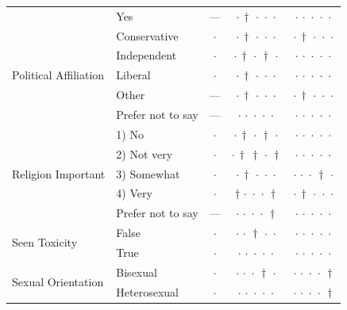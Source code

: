 {\begin{longtable}[t]{llccc}
 & Yes & --- & ${\cdot}\,{\dagger}\,{\cdot}\,{\cdot}\,{\cdot}$ & ${\cdot}\,{\cdot}\,{\cdot}\,{\cdot}\,{\cdot}$ \\
\cline{1-5}
\multirow[t]{5}{*}{Political Affiliation} & Conservative & $\cdot$ & ${\cdot}\,{\dagger}\,{\cdot}\,{\cdot}\,{\cdot}$ & ${\cdot}\,{\dagger}\,{\cdot}\,{\cdot}\,{\cdot}$ \\
 & Independent & $\cdot$ & ${\cdot}\,{\dagger}\,{\cdot}\,{\dagger}\,{\cdot}$ & ${\cdot}\,{\cdot}\,{\cdot}\,{\cdot}\,{\cdot}$ \\
 & Liberal & $\cdot$ & ${\cdot}\,{\dagger}\,{\cdot}\,{\cdot}\,{\cdot}$ & ${\cdot}\,{\cdot}\,{\cdot}\,{\cdot}\,{\cdot}$ \\
 & Other & --- & ${\cdot}\,{\dagger}\,{\cdot}\,{\cdot}\,{\cdot}$ & ${\cdot}\,{\dagger}\,{\cdot}\,{\cdot}\,{\cdot}$ \\
 & Prefer not to say & --- & ${\cdot}\,{\cdot}\,{\cdot}\,{\cdot}\,{\cdot}$ & ${\cdot}\,{\cdot}\,{\cdot}\,{\cdot}\,{\cdot}$ \\
\cline{1-5}
\multirow[t]{5}{*}{Religion Important} & 1) No & $\cdot$ & ${\cdot}\,{\dagger}\,{\cdot}\,{\dagger}\,{\cdot}$ & ${\cdot}\,{\cdot}\,{\cdot}\,{\cdot}\,{\cdot}$ \\
 & 2) Not very & $\cdot$ & ${\cdot}\,{\dagger}\,{\dagger}\,{\cdot}\,{\dagger}$ & ${\cdot}\,{\cdot}\,{\cdot}\,{\cdot}\,{\cdot}$ \\
 & 3) Somewhat & $\cdot$ & ${\cdot}\,{\dagger}\,{\cdot}\,{\cdot}\,{\cdot}$ & ${\cdot}\,{\cdot}\,{\cdot}\,{\dagger}\,{\cdot}$ \\
 & 4) Very & $\cdot$ & ${\dagger}\,{\cdot}\,{\cdot}\,{\cdot}\,{\dagger}$ & ${\cdot}\,{\dagger}\,{\cdot}\,{\cdot}\,{\cdot}$ \\
 & Prefer not to say & --- & ${\cdot}\,{\cdot}\,{\cdot}\,{\cdot}\,{\dagger}$ & ${\cdot}\,{\cdot}\,{\cdot}\,{\cdot}\,{\cdot}$ \\
\cline{1-5}
\multirow[t]{2}{*}{Seen Toxicity} & False & $\cdot$ & ${\cdot}\,{\cdot}\,{\dagger}\,{\cdot}\,{\cdot}$ & ${\cdot}\,{\cdot}\,{\cdot}\,{\cdot}\,{\cdot}$ \\
 & True & $\cdot$ & ${\cdot}\,{\cdot}\,{\cdot}\,{\cdot}\,{\cdot}$ & ${\cdot}\,{\cdot}\,{\cdot}\,{\cdot}\,{\cdot}$ \\
\cline{1-5}
\multirow[t]{5}{*}{Sexual Orientation} & Bisexual & $\cdot$ & ${\cdot}\,{\cdot}\,{\cdot}\,{\dagger}\,{\cdot}$ & ${\cdot}\,{\cdot}\,{\cdot}\,{\cdot}\,{\dagger}$ \\
 & Heterosexual & $\cdot$ & ${\cdot}\,{\cdot}\,{\cdot}\,{\cdot}\,{\cdot}$ & ${\cdot}\,{\cdot}\,{\cdot}\,{\cdot}\,{\dagger}$ \\

\end{longtable}}
